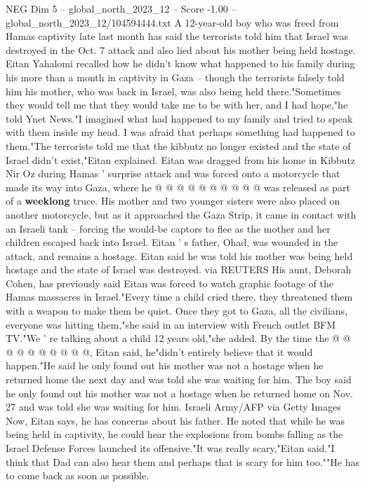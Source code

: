 \begin{textsample}{NEG Dim 5 – global\_north\_2023\_12 – Score -1.00 – global\_north\_2023\_12/104594444.txt}  \label{ex:f5_neg_051}
A 12-year-old boy who was freed from Hamas captivity late last month has said the terrorists told him that Israel was destroyed in the Oct. 7 attack and also lied about his mother being held hostage.
Eitan Yahalomi recalled how he didn't know what happened to his family during his more than a month in captivity in Gaza -- though the terrorists falsely told him his mother, who was back in Israel, was also being held there."Sometimes they would tell me that they would take me to be with her, and I had hope,"he told Ynet News."I imagined what had happened to my family and tried to speak with them inside my head.
I was afraid that perhaps something had happened to them."The terrorists told me that the kibbutz no longer existed and the state of Israel didn't exist,"Eitan explained.
Eitan was dragged from his home in Kibbutz Nir Oz during Hamas ' surprise attack and was forced onto a motorcycle that made its way into Gaza, where he @ @ @ @ @ @ @ @ @ @ was released as part of a \textbf{weeklong} truce.
His mother and two younger sisters were also placed on another motorcycle, but as it approached the Gaza Strip, it came in contact with an Israeli tank -- forcing the would-be captors to flee as the mother and her children escaped back into Israel.
Eitan ' s father, Ohad, was wounded in the attack, and remains a hostage.
Eitan said he was told his mother was being held hostage and the state of Israel was destroyed. via REUTERS His aunt, Deborah Cohen, has previously said Eitan was forced to watch graphic footage of the Hamas massacres in Israel."Every time a child cried there, they threatened them with a weapon to make them be quiet.
Once they got to Gaza, all the civilians, everyone was hitting them,"she said in an interview with French outlet BFM TV."We ' re talking about a child 12 years old,"she added.
By the time the @ @ @ @ @ @ @ @ @ @, Eitan said, he"didn't entirely believe that it would happen."He said he only found out his mother was not a hostage when he returned home the next day and was told she was waiting for him.
The boy said he only found out his mother was not a hostage when he returned home on Nov. 27 and was told she was waiting for him.
Israeli Army/AFP via Getty Images Now, Eitan says, he has concerns about his father.
He noted that while he was being held in captivity, he could hear the explosions from bombs falling as the Israel Defense Forces launched its offensive."It was really scary,"Eitan said."I think that Dad can also hear them and perhaps that is scary for him too.""He has to come back as soon as possible.

\end{textsample}
